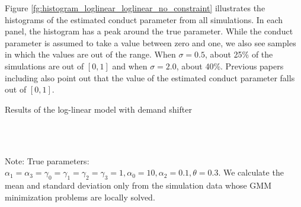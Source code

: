 \documentclass[11pt, a4paper]{article}
\begin{document}
Figure \ref{fg:histogram_loglinear_loglinear_no_constraint} illustrates the histograms of the estimated conduct parameter from all simulations.
In each panel, the histogram has a peak around the true parameter.
While the conduct parameter is assumed to take a value between zero and one, we also see samples in which the values are out of the range. 
When $\sigma = 0.5$, about 25\% of the simulations are out of $[0,1]$ and when $\sigma = 2.0$, about 40\%. 
Previous papers including \citet{okazaki2022excess} also point out that the value of the estimated conduct parameter falls out of $[0,1]$.

\begin{table}[!htbp]
      \begin{center}
          \caption{Results of the log-linear model with demand shifter}
          \label{tb:loglinear_loglinear_non_constraint} 
          \subfloat[$\sigma=0.001$]{}\\
          \subfloat[$\sigma=0.5$]{}\\
            \subfloat[$\sigma=2.0$]{}
      \end{center}\footnotesize
      Note: True parameters: $\alpha_1 = \alpha_3 = \gamma_0 = \gamma_1 = \gamma_2  = \gamma_3 = 1, \alpha_0 = 10, \alpha_2 = 0.1,  \theta = 0.3.$ We calculate the mean and standard deviation only from the simulation data whose GMM minimization problems are locally solved.  
\end{table} 
\end{document}
